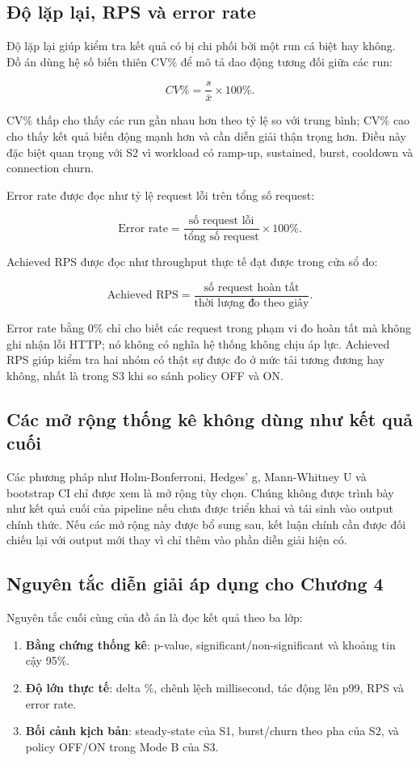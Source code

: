 \subsection{Độ lặp lại, RPS và error rate}
Độ lặp lại giúp kiểm tra kết quả có bị chi phối bởi một run cá biệt hay không. Đồ án dùng hệ số biến thiên CV\% để mô tả dao động tương đối giữa các run:

\[
CV\% = \frac{s}{\bar{x}} \times 100\%.
\]

CV\% thấp cho thấy các run gần nhau hơn theo tỷ lệ so với trung bình; CV\% cao cho thấy kết quả biến động mạnh hơn và cần diễn giải thận trọng hơn. Điều này đặc biệt quan trọng với S2 vì workload có ramp-up, sustained, burst, cooldown và connection churn.

Error rate được đọc như tỷ lệ request lỗi trên tổng số request:

\[
\text{Error rate} = \frac{\text{số request lỗi}}{\text{tổng số request}} \times 100\%.
\]

Achieved RPS được đọc như throughput thực tế đạt được trong cửa sổ đo:

\[
\text{Achieved RPS} = \frac{\text{số request hoàn tất}}{\text{thời lượng đo theo giây}}.
\]

Error rate bằng 0\% chỉ cho biết các request trong phạm vi đo hoàn tất mà không ghi nhận lỗi HTTP; nó không có nghĩa hệ thống không chịu áp lực. Achieved RPS giúp kiểm tra hai nhóm có thật sự được đo ở mức tải tương đương hay không, nhất là trong S3 khi so sánh policy OFF và ON.

\subsection{Các mở rộng thống kê không dùng như kết quả cuối}
Các phương pháp như Holm-Bonferroni, Hedges' g, Mann-Whitney U và bootstrap CI chỉ được xem là mở rộng tùy chọn. Chúng không được trình bày như kết quả cuối của pipeline nếu chưa được triển khai và tái sinh vào output chính thức. Nếu các mở rộng này được bổ sung sau, kết luận chính cần được đối chiếu lại với output mới thay vì chỉ thêm vào phần diễn giải hiện có.

\subsection{Nguyên tắc diễn giải áp dụng cho Chương 4}
Nguyên tắc cuối cùng của đồ án là đọc kết quả theo ba lớp:

\begin{enumerate}
  \item \textbf{Bằng chứng thống kê}: p-value, significant/non-significant và khoảng tin cậy 95\%.
  \item \textbf{Độ lớn thực tế}: delta \%, chênh lệch millisecond, tác động lên p99, RPS và error rate.
  \item \textbf{Bối cảnh kịch bản}: steady-state của S1, burst/churn theo pha của S2, và policy OFF/ON trong Mode B của S3.
\end{enumerate}

